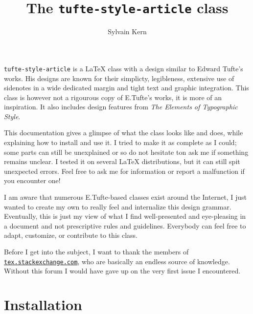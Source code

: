 \documentclass[raggedright, twoside, 11pt]{tufte-style-article}
\title{The \texttt{tufte-style-article} class}
\author{Sylvain Kern}
\begin{document}
\maketitle	

\noindent
\texttt{tufte-style-article} is a \LaTeX{} class with a design similar to Edward Tufte's works. His designs are known for their simplicty, legibleness, extensive use of sidenotes in a wide dedicated margin and tight text and graphic integration. This class is however not a rigourous copy of E.Tufte's works, it is more of an inspiration. It also includes design features from \textit{The Elements of Typographic Style}.

This documentation gives a glimpse of what the class looks like and does, while explaining how to install and use it. I tried to make it as complete as I could; some parts can still be unexplained or so do not hesitate ton ask me if something remains unclear. I tested it on several \LaTeX{} distributions, but it can still spit unexpected errors. Feel free to ask me for information or report a malfunction if you encounter one!

I am aware that numerous E.Tufte-based classes exist around the Internet, I just wanted to create my own to really feel and internalize this design grammar. Eventually, this is just my view of what I find well-presented and eye-pleasing in a document and not prescriptive rules and guidelines. Everybody can feel free to adapt, customize, or contribute to this class.

Before I get into the subject, I want to thank the members of\\\noindent \href{www.tex.stackexchange.com}{\texttt{tex.stackexchange.com}}, who are basically an endless source of knowledge. Without this forum I would have gave up on the very first issue I encountered. 

\newpage
\tableofcontents
\newpage


\section{Installation}
\end{document}
